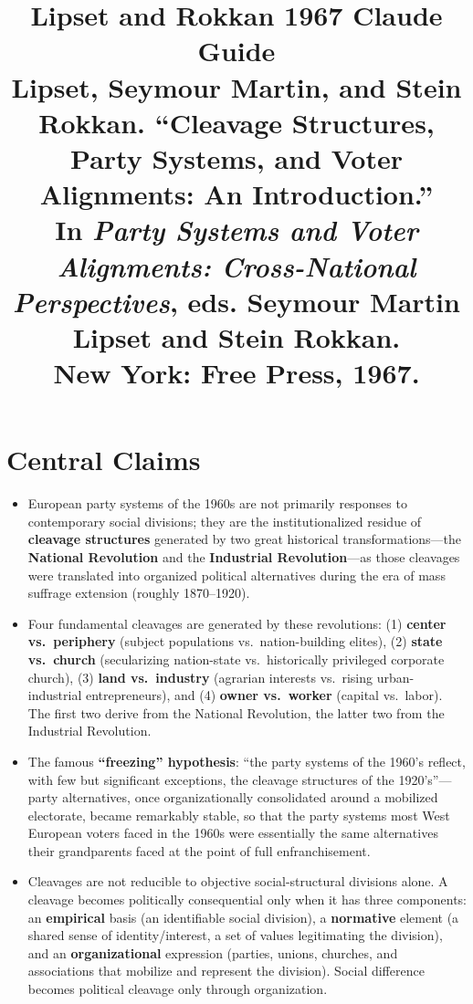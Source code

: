 \documentclass[12pt]{article}
\title{\textbf{Lipset and Rokkan 1967 Claude Guide}\\
\large Lipset, Seymour Martin, and Stein Rokkan. ``Cleavage Structures, Party Systems, and Voter Alignments: An Introduction.''\\
In \textit{Party Systems and Voter Alignments: Cross-National Perspectives}, eds. Seymour Martin Lipset and Stein Rokkan.\\
New York: Free Press, 1967.}
\author{}
\date{}
\begin{document}
\maketitle
\tableofcontents
\newpage

\section{Central Claims}

\begin{itemize}[leftmargin=*, itemsep=4pt]
    \item European party systems of the 1960s are not primarily responses to contemporary social divisions; they are the institutionalized residue of \textbf{cleavage structures} generated by two great historical transformations---the \textbf{National Revolution} and the \textbf{Industrial Revolution}---as those cleavages were translated into organized political alternatives during the era of mass suffrage extension (roughly 1870--1920).
    \item Four fundamental cleavages are generated by these revolutions: (1) \textbf{center vs.\ periphery} (subject populations vs.\ nation-building elites), (2) \textbf{state vs.\ church} (secularizing nation-state vs.\ historically privileged corporate church), (3) \textbf{land vs.\ industry} (agrarian interests vs.\ rising urban-industrial entrepreneurs), and (4) \textbf{owner vs.\ worker} (capital vs.\ labor). The first two derive from the National Revolution, the latter two from the Industrial Revolution.
    \item The famous \textbf{``freezing'' hypothesis}: ``the party systems of the 1960's reflect, with few but significant exceptions, the cleavage structures of the 1920's''---party alternatives, once organizationally consolidated around a mobilized electorate, became remarkably stable, so that the party systems most West European voters faced in the 1960s were essentially the same alternatives their grandparents faced at the point of full enfranchisement.
    \item Cleavages are not reducible to objective social-structural divisions alone. A cleavage becomes politically consequential only when it has three components: an \textbf{empirical} basis (an identifiable social division), a \textbf{normative} element (a shared sense of identity/interest, a set of values legitimating the division), and an \textbf{organizational} expression (parties, unions, churches, and associations that mobilize and represent the division). Social difference becomes political cleavage only through organization.

\end{itemize}
\end{document}
